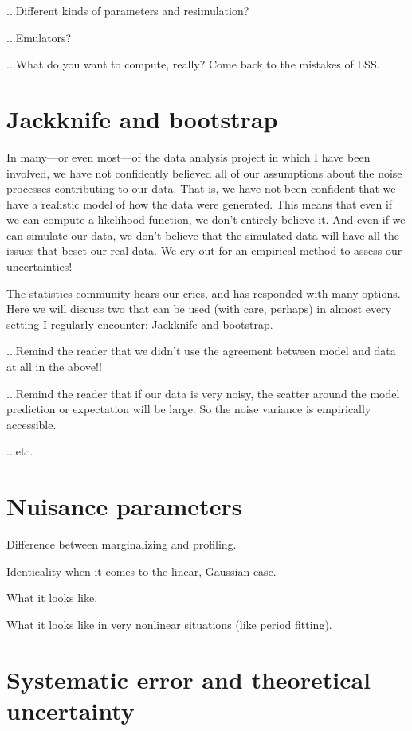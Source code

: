 \documentclass[10pt]{article}
\begin{document}
...Different kinds of parameters and resimulation?

...Emulators?

...What do you want to compute, really? Come back to the mistakes of LSS.

\section{Jackknife and bootstrap}\label{sec:empirical}

In many---or even most---of the data analysis project in which I have been
involved, we have not confidently believed all of our assumptions about the
noise processes contributing to our data.
That is, we have not been confident that we have a realistic model of how
the data were generated.
This means that even if we can compute a likelihood function, we don't entirely
believe it.
And even if we can simulate our data, we don't believe that the simulated data
will have all the issues that beset our real data.
We cry out for an empirical method to assess our uncertainties!

The statistics community hears our cries, and has responded with many options.
Here we will discuss two that can be used (with care, perhaps) in almost every
setting I regularly encounter: Jackknife and bootstrap.

...Remind the reader that we didn't use the agreement between model and data
at all in the above!!

...Remind the reader that if our data is very noisy, the scatter around the
model prediction or expectation will be large. So the noise variance is empirically
accessible.

...etc.

\section{Nuisance parameters}

Difference between marginalizing and profiling.

Identicality when it comes to the linear, Gaussian case.

What it looks like.

What it looks like in very nonlinear situations (like period fitting).

\section{Systematic error and theoretical uncertainty}
\end{document}
